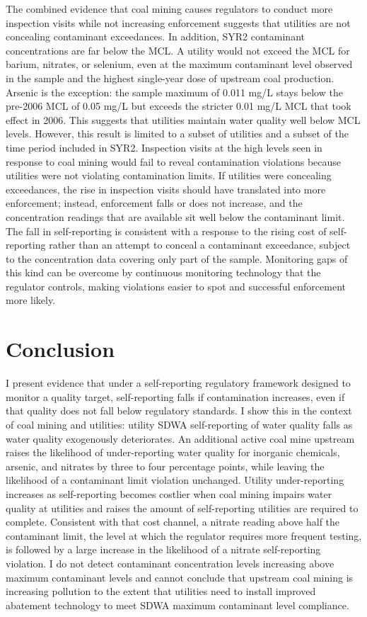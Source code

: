 \documentclass[12pt]{article}
\begin{document}
The combined evidence that coal mining causes regulators to conduct more inspection visits while not increasing enforcement suggests that utilities are not concealing contaminant exceedances. In addition, SYR2 contaminant concentrations are far below the MCL. A utility would not exceed the MCL for barium, nitrates, or selenium, even at the maximum contaminant level observed in the sample and the highest single-year dose of upstream coal production. Arsenic is the exception: the sample maximum of 0.011 mg/L stays below the pre-2006 MCL of 0.05 mg/L but exceeds the stricter 0.01 mg/L MCL that took effect in 2006. This suggests that utilities maintain water quality well below MCL levels. However, this result is limited to a subset of utilities and a subset of the time period included in SYR2. Inspection visits at the high levels seen in response to coal mining would fail to reveal contamination violations because utilities were not violating contamination limits. If utilities were concealing exceedances, the rise in inspection visits should have translated into more enforcement; instead, enforcement falls or does not increase, and the concentration readings that are available sit well below the contaminant limit. The fall in self-reporting is consistent with a response to the rising cost of self-reporting rather than an attempt to conceal a contaminant exceedance, subject to the concentration data covering only part of the sample. Monitoring gaps of this kind can be overcome by continuous monitoring technology that the regulator controls, making violations easier to spot and successful enforcement more likely.

\section{Conclusion}\label{sec:conclusion}

I present evidence that under a self-reporting regulatory framework designed to monitor a quality target, self-reporting falls if contamination increases, even if that quality does not fall below regulatory standards. I show this in the context of coal mining and utilities: utility SDWA self-reporting of water quality falls as water quality exogenously deteriorates. An additional active coal mine upstream raises the likelihood of under-reporting water quality for inorganic chemicals, arsenic, and nitrates by three to four percentage points, while leaving the likelihood of a contaminant limit violation unchanged. Utility under-reporting increases as self-reporting becomes costlier when coal mining impairs water quality at utilities and raises the amount of self-reporting utilities are required to complete. Consistent with that cost channel, a nitrate reading above half the contaminant limit, the level at which the regulator requires more frequent testing, is followed by a large increase in the likelihood of a nitrate self-reporting violation. I do not detect contaminant concentration levels increasing above maximum contaminant levels and cannot conclude that upstream coal mining is increasing pollution to the extent that utilities need to install improved abatement technology to meet SDWA maximum contaminant level compliance. 
\end{document}
